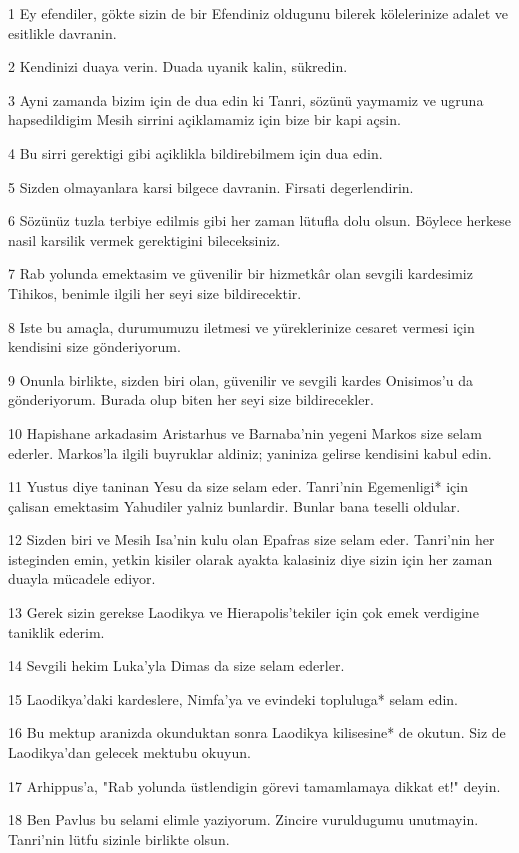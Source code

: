 \par 1 Ey efendiler, gökte sizin de bir Efendiniz oldugunu bilerek kölelerinize adalet ve esitlikle davranin.
\par 2 Kendinizi duaya verin. Duada uyanik kalin, sükredin.
\par 3 Ayni zamanda bizim için de dua edin ki Tanri, sözünü yaymamiz ve ugruna hapsedildigim Mesih sirrini açiklamamiz için bize bir kapi açsin.
\par 4 Bu sirri gerektigi gibi açiklikla bildirebilmem için dua edin.
\par 5 Sizden olmayanlara karsi bilgece davranin. Firsati degerlendirin.
\par 6 Sözünüz tuzla terbiye edilmis gibi her zaman lütufla dolu olsun. Böylece herkese nasil karsilik vermek gerektigini bileceksiniz.
\par 7 Rab yolunda emektasim ve güvenilir bir hizmetkâr olan sevgili kardesimiz Tihikos, benimle ilgili her seyi size bildirecektir.
\par 8 Iste bu amaçla, durumumuzu iletmesi ve yüreklerinize cesaret vermesi için kendisini size gönderiyorum.
\par 9 Onunla birlikte, sizden biri olan, güvenilir ve sevgili kardes Onisimos'u da gönderiyorum. Burada olup biten her seyi size bildirecekler.
\par 10 Hapishane arkadasim Aristarhus ve Barnaba'nin yegeni Markos size selam ederler. Markos'la ilgili buyruklar aldiniz; yaniniza gelirse kendisini kabul edin.
\par 11 Yustus diye taninan Yesu da size selam eder. Tanri'nin Egemenligi* için çalisan emektasim Yahudiler yalniz bunlardir. Bunlar bana teselli oldular.
\par 12 Sizden biri ve Mesih Isa'nin kulu olan Epafras size selam eder. Tanri'nin her isteginden emin, yetkin kisiler olarak ayakta kalasiniz diye sizin için her zaman duayla mücadele ediyor.
\par 13 Gerek sizin gerekse Laodikya ve Hierapolis'tekiler için çok emek verdigine taniklik ederim.
\par 14 Sevgili hekim Luka'yla Dimas da size selam ederler.
\par 15 Laodikya'daki kardeslere, Nimfa'ya ve evindeki topluluga* selam edin.
\par 16 Bu mektup aranizda okunduktan sonra Laodikya kilisesine* de okutun. Siz de Laodikya'dan gelecek mektubu okuyun.
\par 17 Arhippus'a, "Rab yolunda üstlendigin görevi tamamlamaya dikkat et!" deyin.
\par 18 Ben Pavlus bu selami elimle yaziyorum. Zincire vuruldugumu unutmayin. Tanri'nin lütfu sizinle birlikte olsun.


